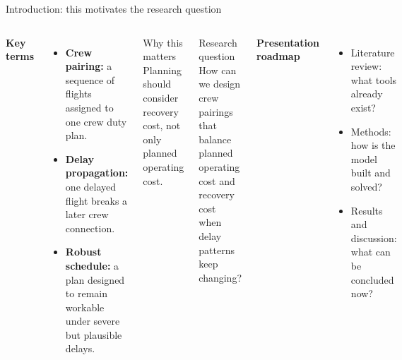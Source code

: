 \documentclass[aspectratio=169,11pt]{beamer}
\begin{document}
\begin{frame}{Introduction: this motivates the research question}
  \begin{columns}[T,onlytextwidth]
      \textbf{Key terms}
      \begin{itemize}
        \item \textbf{Crew pairing:} a sequence of flights assigned to one crew duty plan.
        \item \textbf{Delay propagation:} one delayed flight breaks a later crew connection.
        \item \textbf{Robust schedule:} a plan designed to remain workable under severe but plausible delays.
      \end{itemize}

      \begin{alertblock}{Why this matters}
        Planning should consider recovery cost, not only planned operating cost.
      \end{alertblock}

      \begin{exampleblock}{Research question}
        How can we design crew pairings that balance planned operating cost and recovery cost when delay patterns keep changing?
      \end{exampleblock}

      \textbf{Presentation roadmap}
      \begin{itemize}
        \item Literature review: what tools already exist?
        \item Methods: how is the model built and solved?
        \item Results and discussion: what can be concluded now?
      \end{itemize}
  \end{columns}
\end{frame}
\end{document}
